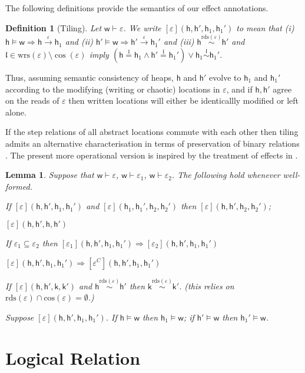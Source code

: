 \documentclass[nocopyrightspace,preprint]{sigplanconf}
\newcommand{\rdsin}[1]{\mathrm{rds}({#1})}
\newcommand{\eff}{\varepsilon}
\newcommand{\writes}{\mathrm{wrs}}
\newcommand{\wrs}{\writes}
\newcommand{\concs}[1]{\mathrm{cos}(#1)}
\newtheorem{lemma}[theorem]{Lemma}
\newtheorem{definition}[theorem]{Definition}
\newcommand{\loc}{\mathfrak{l}}
\newcommand\w{\ensuremath{\mathsf{w}}\xspace}
\newcommand\heap{\ensuremath{\mathsf{h}}\xspace}
\newcommand\h{\heap}
\renewcommand\k{\ensuremath{\mathsf{k}}\xspace}
\newcommand\rloc[3]{\ensuremath{#1 \stackrel{#3}{\sim} #2}}
\newcommand\rrloc[3]{\ensuremath{#1 \stackrel{#3}{=} #2}}
\newcommand\gloc[3]{\ensuremath{#1 \xrightarrow{#3}#2}}
\begin{document}
The following definitions provide the semantics of our effect annotations. 
\begin{definition}[Tiling]
Let $\w\vdash\eff$. We write $[\eff](\h,\h',\h_1,\h_1')$ to mean that (i) $\h\models\w\Rightarrow \gloc{\h}{\h_1}{\eff}$ and 
(ii) $\h'\models \w\Rightarrow \gloc{\h'}{\h_1'}{\eff}$ and (iii) $\rloc{\h}{\h'}{\rdsin{\eff}}$ and  $\loc\in\wrs(\eff)\setminus\cos(\eff)$ imply $(\rrloc{\h}{\h_1}{\loc}\wedge\rrloc{\h'}{\h_1'}{\loc})\vee \rloc{\h_1}{\h_1'}{\loc}$.
\end{definition}
Thus, assuming semantic consistency of heaps, $\h$ and $\h'$ evolve to $\h_1$ and $\h_1'$ according to the modifying (writing or chaotic) locations in $\eff$, and if $\h,\h'$ agree on the reads of $\eff$ then written locations will either be identicallly modified or left alone.  

If the step relations of all abstract locations commute with each
other then tiling admits an alternative characterisation in terms of
preservation of binary relations \cite{DBLP:conf/aplas/BentonKHB06}. The present more
operational version is inspired by the treatment of effects in
\cite{birkedal}.

\begin{lemma}\label{tillem}
Suppose that $\w\vdash\eff$, $\w\vdash\eff_1$, $\w\vdash\eff_2$. 
The following hold whenever well-formed. 
\begin{compactenum}
\item \label{tiltrans}
If $[\eff](\h,\h',\h_1,\h_1')$ and $[\eff](\h_1,\h_1',\h_2,\h_2')$ then $[\eff](\h,\h',\h_2,\h_2')$;  
\item $[\eff](\h,\h',\h,\h')$ 
\item\label{tilmon} If $\eff_1\subseteq \eff_2$ then $[\eff_1](\h,\h',\h_1,\h_1')\Rightarrow 
[\eff_2](\h,\h',\h_1,\h_1')$
\item\label{tilmcon} $[\eff](\h,\h',\h_1,\h_1')\Rightarrow 
[\eff^C](\h,\h',\h_1,\h_1')$
\item \label{tilrd} If $[\eff](\h,\h',\k,\k')$ and $\rloc{\h}{\h'}{\rdsin{\eff}}$ then  $\rloc{\k}{\k'}{\rdsin{\eff}}$. (this relies on $\rdsin{\eff}\cap\concs{\eff}=\emptyset$.)
\item\label{tilwf} Suppose $[\eff](\h,\h',\h_1,\h_1')$. If $\h\models\w$ then $\h_1\models\w$; if $\h'\models\w$ then $\h_1'\models\w$. 
\end{compactenum}
\end{lemma}
\section{Logical Relation}\label{logrel}
\end{document}
